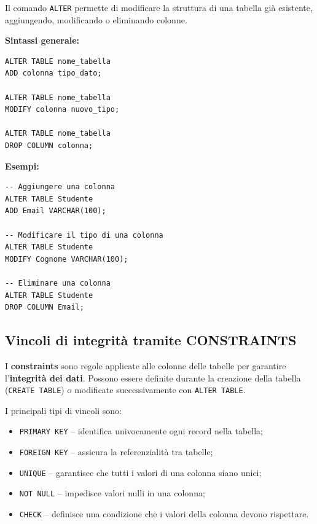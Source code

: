 \documentclass[a4paper,12pt]{article}
\newcommand{\code}[1]{\texttt{#1}}
\begin{document}
Il comando \code{ALTER} permette di modificare la struttura di una tabella già esistente, aggiungendo, modificando o eliminando colonne. 

\textbf{Sintassi generale:}
\begin{verbatim}
ALTER TABLE nome_tabella
ADD colonna tipo_dato;

ALTER TABLE nome_tabella
MODIFY colonna nuovo_tipo;

ALTER TABLE nome_tabella
DROP COLUMN colonna;
\end{verbatim}

\textbf{Esempi:}

\begin{verbatim}
-- Aggiungere una colonna
ALTER TABLE Studente
ADD Email VARCHAR(100);

-- Modificare il tipo di una colonna
ALTER TABLE Studente
MODIFY Cognome VARCHAR(100);

-- Eliminare una colonna
ALTER TABLE Studente
DROP COLUMN Email;
\end{verbatim}

\subsection{Vincoli di integrità tramite CONSTRAINTS}

I \textbf{constraints} sono regole applicate alle colonne delle tabelle per garantire l'\textbf{integrità dei dati}.  
Possono essere definite durante la creazione della tabella (\code{CREATE TABLE}) o modificate successivamente con \code{ALTER TABLE}. 

I principali tipi di vincoli sono:

\begin{itemize}
    \item \code{PRIMARY KEY} -- identifica univocamente ogni record nella tabella;
    \item \code{FOREIGN KEY} -- assicura la referenzialità tra tabelle;
    \item \code{UNIQUE} -- garantisce che tutti i valori di una colonna siano unici;
    \item \code{NOT NULL} -- impedisce valori nulli in una colonna;
    \item \code{CHECK} -- definisce una condizione che i valori della colonna devono rispettare.
\end{itemize}
\end{document}
